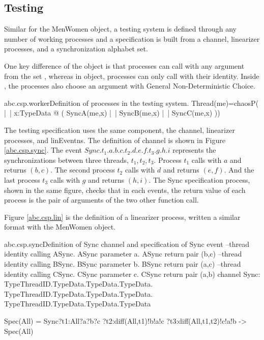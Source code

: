 \documentclass[a4paper, 12pt]{article}
\begin{document}
\subsection{Testing}
Similar for the MenWomen object, a testing system is defined through any number of working processes and a specification is built from a  channel, linearizer processes, and a synchronization alphabet set. 

One key difference of the  object is that processes can call with any argument from the set , whereas in  object, processes can only call with their identity. Inside , the processes also choose an argument with General Non-Deterministic Choice. 

\begin{cspinline}{abc.csp.worker}{Definition of processes in the testing system.}
Thread(me)=chaosP( |~| x:TypeData @ (
    SyncA(me,x) 
  |~| SyncB(me,x) 
  |~| SyncC(me,x)
))
\end{cspinline}

The testing specification uses the same component, the  channel, linearizer processes, and linEventns. The definition of  channel is shown in Figure \ref{abc.csp.sync}. The event $Sync.t_1.a.b.c.t_2.d.e.f.t_3.g.h.i$ represents the synchronizations between three threads, $t_1,t_2,t_3$. Process $t_1$ calls  with $a$ and returns $(b,c)$. The second process $t_2$ calls  with $d$ and returns $(e,f)$. And the last process $t_3$ calls  with $g$ and returns $(h,i)$. The Sync specification process, shown in the same figure, checks that in each  events, the return value of each process is the pair of arguments of the two other function call. 

Figure \ref{abc.csp.lin} is the definition of a linearizer process, written a similar format with the MenWomen object.

\begin{cspfloat}{abc.csp.sync}{Definition of Sync channel and specification of Sync event}
--thread identity calling ASync. ASync parameter a. ASync return pair (b,c)
--thread identity calling BSync. BSync parameter b. BSync return pair (a,c)
--thread identity calling CSync. CSync parameter c. CSync return pair (a,b)
channel Sync: TypeThreadID.TypeData.TypeData.TypeData.
              TypeThreadID.TypeData.TypeData.TypeData.
              TypeThreadID.TypeData.TypeData.TypeData

Spec(All) = 
  Sync?t1:All?a?b?c
      ?t2:diff(All,{t1})!b!a!c
      ?t3:diff(All,{t1,t2})!c!a!b -> 
  Spec(All)
\end{cspfloat}
\end{document}
